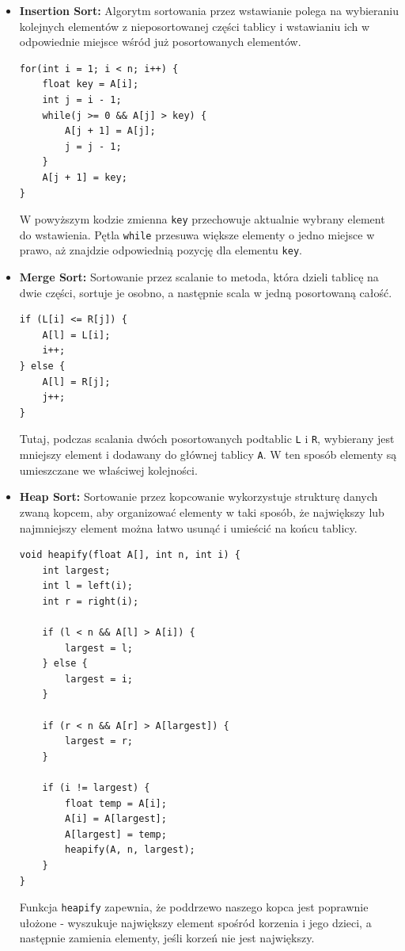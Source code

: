 \documentclass{article}
\begin{document}
	\begin{itemize}
		\item \textbf{Insertion Sort:} Algorytm sortowania przez wstawianie polega na wybieraniu kolejnych elementów z nieposortowanej części tablicy i wstawianiu ich w odpowiednie miejsce wśród już posortowanych elementów.
		\begin{lstlisting}
for(int i = 1; i < n; i++) {
	float key = A[i];
	int j = i - 1;
	while(j >= 0 && A[j] > key) {
		A[j + 1] = A[j];
		j = j - 1;
	}
	A[j + 1] = key;
}
		\end{lstlisting}
		W powyższym kodzie zmienna \texttt{key} przechowuje aktualnie wybrany element do wstawienia. Pętla \texttt{while} przesuwa większe elementy o jedno miejsce w prawo, aż znajdzie odpowiednią pozycję dla elementu \texttt{key}.
		
		\item \textbf{Merge Sort:} Sortowanie przez scalanie to metoda, która dzieli tablicę na dwie części, sortuje je osobno, a następnie scala w jedną posortowaną całość.
		\begin{lstlisting}
if (L[i] <= R[j]) {
	A[l] = L[i];
	i++;
} else {
	A[l] = R[j];
	j++;
}
		\end{lstlisting}
		Tutaj, podczas scalania dwóch posortowanych podtablic \texttt{L} i \texttt{R}, wybierany jest mniejszy element i dodawany do głównej tablicy \texttt{A}. W ten sposób elementy są umieszczane we właściwej kolejności.
		
		\item \textbf{Heap Sort:} Sortowanie przez kopcowanie wykorzystuje strukturę danych zwaną kopcem, aby organizować elementy w taki sposób, że największy lub najmniejszy element można łatwo usunąć i umieścić na końcu tablicy.
		\begin{lstlisting}
void heapify(float A[], int n, int i) {
	int largest;
	int l = left(i);
	int r = right(i);
	
	if (l < n && A[l] > A[i]) {
		largest = l;
	} else {
		largest = i;
	}
	
	if (r < n && A[r] > A[largest]) {
		largest = r;
	}
	
	if (i != largest) {
		float temp = A[i];
		A[i] = A[largest];
		A[largest] = temp;
		heapify(A, n, largest);
	}
}

		\end{lstlisting}
		Funkcja \texttt{heapify} zapewnia, że poddrzewo naszego kopca jest poprawnie ułożone - wyszukuje największy element spośród korzenia i jego dzieci, a następnie zamienia elementy, jeśli korzeń nie jest największy.
	\end{itemize}
	
\end{document}
